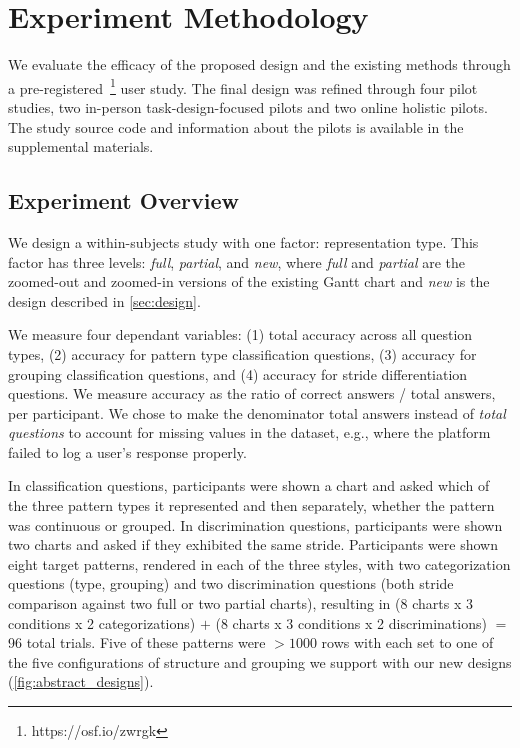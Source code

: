 \section{Experiment Methodology}
\label{sec:methodology}

We evaluate the efficacy of the proposed design and the existing methods through a pre-registered~\footnote{
https://osf.io/zwrgk}
user study. The final design was refined through four pilot studies, two in-person task-design-focused pilots and two online holistic pilots. The study source code and information about the pilots is available in the supplemental materials.

\subsection{Experiment Overview}

We design a within-subjects study with one factor: representation type. This factor has three levels: {\em full}, {\em partial}, and {\em new}, where {\em full} and {\em partial} are the zoomed-out and zoomed-in versions of the existing Gantt chart and {\em new} is the design described in \autoref{sec:design}.

We measure four dependant variables: (1) total accuracy across all question types, (2) accuracy for pattern type classification questions, (3) accuracy for grouping classification questions, and (4) accuracy for stride differentiation questions. We measure accuracy as the ratio of correct answers / total answers, per participant. We chose to make the denominator total answers instead of \textit{total questions} to account for missing values in the dataset, e.g., where the platform failed to log a user's response properly. 

In classification questions, participants were shown a chart and asked which of the three pattern types it represented and then separately, whether the pattern was continuous or grouped. In discrimination questions, participants were shown two charts and asked if they exhibited the same stride. Participants were shown eight target patterns, rendered in each of the three styles, with two categorization questions (type, grouping) and two discrimination questions (both stride comparison against two full or two partial charts), resulting in (8 charts x 3 conditions x 2 categorizations) $+$ (8 charts x 3 conditions x 2 discriminations) $=$ 96 total trials. Five of these patterns were $>1000$ rows with each set to one  of the five configurations of structure and grouping we support with our new designs (\autoref{fig:abstract_designs}).
    
